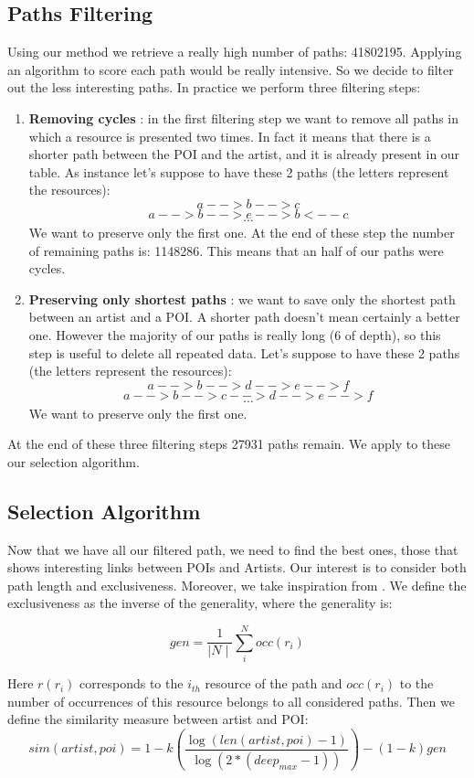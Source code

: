 \documentclass[paper=a4, fontsize=11pt]{scrartcl}
\begin{document}
\subsection{Paths Filtering}
Using our method we retrieve a really high number of paths: 41802195. Applying an algorithm to score each path would be really intensive. So we decide to filter out the less interesting paths.
In practice we perform three filtering steps:
\begin{enumerate}
\item \textbf{Removing cycles} : in the  first filtering step we want to remove all paths in which a resource is presented two times. In fact it means that there is a shorter path between the POI and the artist, and it is already present in our table. As instance let's suppose to have these 2 paths (the letters represent the resources):
$$a-->b-->c$$
$$a-->b-->e-->b<--c$$
$$\cdots$$
We want to preserve only the first one. At the end of these step the number of remaining paths is: 1148286. This means that an half of our paths were cycles.

\item \textbf{Preserving only shortest paths} :  we want to save only the shortest path between an artist and a POI. A shorter path doesn't mean certainly a better one. However the majority of our paths is really long (6 of depth), so this step is useful to delete all repeated data. Let's suppose to have these 2 paths (the letters represent the resources):
$$a-->b-->d-->e-->f$$
$$a-->b-->c-->d-->e-->f$$
$$\cdots$$
We want to preserve only the first one.

\end{enumerate}

At the end of these three filtering steps 27931 paths remain. We apply to these our selection algorithm.

\subsection{Selection Algorithm}
Now that we have all our filtered path, we need to find the best ones, those that shows interesting links between POIs and Artists. Our interest is to consider both path length and exclusiveness. 
Moreover, we take inspiration from \cite{meng2013review}.
We define the exclusiveness as the inverse of the generality, where the generality is:

$$gen =\frac{1}{\mid N \mid}\sum_i^Nocc(r_{i})$$

Here $r(r_{i})$ corresponds to the $i_{th}$ resource of the path and $occ(r_{i})$ to the number of occurrences of this resource belongs to all considered paths.
Then we define the similarity measure between artist and POI:
$$sim(artist,poi) = 1-k(\frac{\log(len(artist,poi)-1)}{\log(2*(deep_{max} -1))})-(1-k)gen$$
\end{document}
